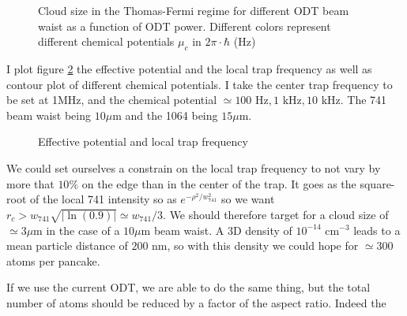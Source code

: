 \documentclass[reprint,amsmath,amssymb,aps,nofootinbib]{revtex4-1}
\begin{document}
\begin{figure}
\begin{center}
\caption{\label{fig:cloud_size_power}Cloud size in the Thomas-Fermi regime for different ODT beam waist as a function of ODT power. Different colors represent different chemical potentials $\mu_{c}$ in $2\pi\cdot\hbar$ (Hz)}
\end{center}
\end{figure}


I plot figure \ref{fig:colorplots_local} the effective potential and the local trap frequency as well as contour plot of different chemical potentials. I take the center trap frequency to be set at 1MHz, and the chemical potential $\simeq 100\text{ Hz}, 1\text{ kHz}, 10\text{ kHz}$. The 741 beam waist being $10\mu$m and the 1064 being $15\mu$m.


\begin{figure}
\begin{center}
\caption{\label{fig:colorplots_local}Effective potential and local trap frequency}
\end{center}
\end{figure}

We could set ourselves a constrain on the local trap frequency to not vary by more that $10\%$ on the edge than in the center of the trap. It goes as the square-root of the local 741 intensity so as $e^{-\rho^{2}/w_{741}^{2}}$ so we want $r_{c} > w_{741}\sqrt{|\ln(0.9)|}\simeq w_{741}/3$. We should therefore target for a cloud size of $\simeq 3\mu$m in the case of a $10\mu$m beam waist. A 3D density of $10^{-14} \text{ cm}^{-3}$ leads to a mean particle distance of $200\text{ nm}$, so with this density we could hope for $\simeq 300$ atoms per pancake.

If we use the current ODT, we are able to do the same thing, but the total number of atoms should be reduced by a factor of the aspect ratio. Indeed the 
\end{document}
